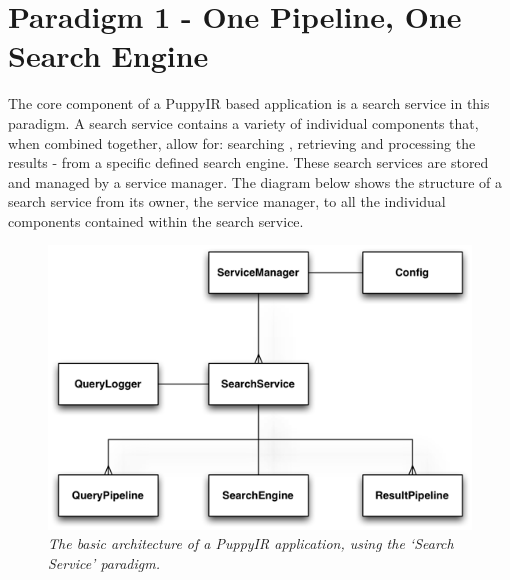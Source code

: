 \documentclass[letterpaper,10pt,english]{sphinxmanual}
\begin{document}
\section{Paradigm 1 - One Pipeline, One Search Engine}
\label{service:service-architecture}\label{service::doc}\label{service:paradigm-1-one-pipeline-one-search-engine}
The core component of a PuppyIR based application is a search service in this paradigm. A search service contains a variety of individual components that, when combined together, allow for: searching , retrieving and processing the results - from a specific defined search engine. These search services are stored and managed by a service manager. The diagram below shows the structure of a search service from its owner, the service manager, to all the individual components contained within the search service.
\begin{figure}[htbp]
\centering
\capstart

\includegraphics{puppy-service-architecture.png}
\caption{\emph{The basic architecture of a PuppyIR application, using the `Search Service' paradigm.}}\end{figure}
\end{document}
